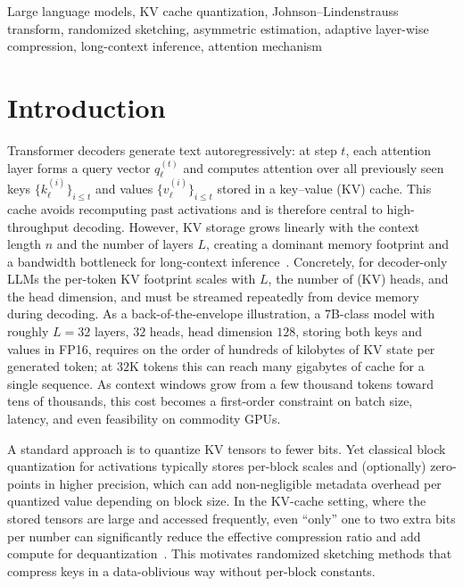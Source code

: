 \documentclass[conference]{IEEEtran}
\begin{document}
\begin{IEEEkeywords}
Large language models, KV cache quantization, Johnson--Lindenstrauss transform, randomized sketching, asymmetric estimation, adaptive layer-wise compression, long-context inference, attention mechanism
\end{IEEEkeywords}

\section{Introduction}
\label{sec:intro}
\noindent
Transformer decoders generate text autoregressively: at step $t$, each attention layer forms a query vector $q_\ell^{(t)}$ and computes attention over all previously seen keys $\{k_\ell^{(i)}\}_{i\le t}$ and values $\{v_\ell^{(i)}\}_{i\le t}$ stored in a key--value (KV) cache. This cache avoids recomputing past activations and is therefore central to high-throughput decoding. However, KV storage grows linearly with the context length $n$ and the number of layers $L$, creating a dominant memory footprint and a bandwidth bottleneck for long-context inference~\cite{zandieh2024qjl}. Concretely, for decoder-only LLMs the per-token KV footprint scales with $L$, the number of (KV) heads, and the head dimension, and must be streamed repeatedly from device memory during decoding. As a back-of-the-envelope illustration, a 7B-class model with roughly $L{=}32$ layers, $32$ heads, head dimension $128$, storing both keys and values in FP16, requires on the order of hundreds of kilobytes of KV state per generated token; at $32$K tokens this can reach many gigabytes of cache for a single sequence. As context windows grow from a few thousand tokens toward tens of thousands, this cost becomes a first-order constraint on batch size, latency, and even feasibility on commodity GPUs.

\noindent
A standard approach is to quantize KV tensors to fewer bits. Yet classical block quantization for activations typically stores per-block scales and (optionally) zero-points in higher precision, which can add non-negligible metadata overhead per quantized value depending on block size. In the KV-cache setting, where the stored tensors are large and accessed frequently, even ``only'' one to two extra bits per number can significantly reduce the effective compression ratio and add compute for dequantization~\cite{zandieh2024qjl}. This motivates randomized sketching methods that compress keys in a data-oblivious way without per-block constants.
\end{document}
